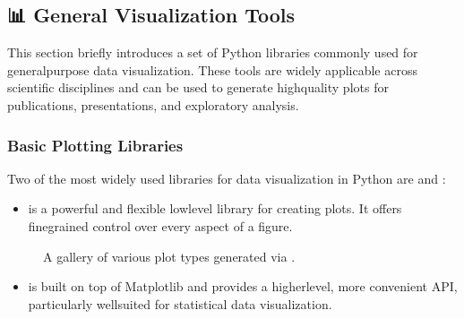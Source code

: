 \documentclass[letterpaper,10pt,english]{jupyterBook}
\begin{document}
\subsection{📊 General Visualization Tools}
\label{\detokenize{chapters/03/03b_visualization-tools:general-visualization-tools}}
\sphinxAtStartPar
This section briefly introduces a set of Python libraries commonly used for general\sphinxhyphen{}purpose data visualization. These tools are widely applicable across scientific disciplines and can be used to generate high\sphinxhyphen{}quality plots for publications, presentations, and exploratory analysis.


\subsubsection{Basic Plotting Libraries}
\label{\detokenize{chapters/03/03b_visualization-tools:basic-plotting-libraries}}
\sphinxAtStartPar
Two of the most widely used libraries for data visualization in Python are  and :
\begin{itemize}
\item {} 
\sphinxAtStartPar
{} is a powerful and flexible low\sphinxhyphen{}level library for creating plots. It offers fine\sphinxhyphen{}grained control over every aspect of a figure.

\end{itemize}

\begin{figure}[htbp]
\centering
\capstart

\noindent{}
\caption{A gallery of various plot types generated via .}\label{\detokenize{chapters/03/03b_visualization-tools:matplotlib}}\end{figure}
\begin{itemize}
\item {} 
\sphinxAtStartPar
{} is built on top of Matplotlib and provides a higher\sphinxhyphen{}level, more convenient API, particularly well\sphinxhyphen{}suited for statistical data visualization.

\end{itemize}
\end{document}
